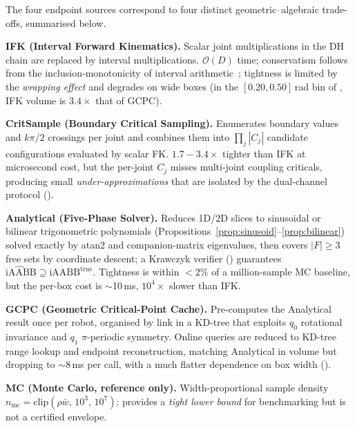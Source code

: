 \documentclass[journal]{IEEEtran}
\newcommand{\iAABB}{\mathrm{iAABB}}
\begin{document}
The four endpoint sources correspond to four distinct geometric--algebraic
trade-offs, summarised below.

\textbf{IFK (Interval Forward Kinematics).}
Scalar joint multiplications in the DH chain are replaced by interval
multiplications. $\mathcal{O}(D)$ time; conservatism follows from the
inclusion-monotonicity of interval arithmetic~\cite{moore2009introduction,
jaulin2001applied}; tightness is limited by the \emph{wrapping effect}
and degrades on wide boxes (in the $[0.20,0.50]$\,rad bin of
, IFK volume is $3.4\times$ that of GCPC).

\textbf{CritSample (Boundary Critical Sampling).}
Enumerates boundary values and $k\pi/2$ crossings per joint and combines
them into $\prod_j |C_j|$ candidate configurations evaluated by scalar
FK. $1.7\!-\!3.4\times$ tighter than IFK at microsecond cost, but the
per-joint $C_j$ misses multi-joint coupling criticals, producing small
\emph{under-approximations} that are isolated by the dual-channel
protocol ().

\textbf{Analytical (Five-Phase Solver).}
Reduces 1D/2D slices to sinusoidal or bilinear trigonometric polynomials
(Propositions~\ref{prop:sinusoid}--\ref{prop:bilinear}) solved
exactly by atan2 and companion-matrix eigenvalues, then covers
$|F|\geq 3$ free sets by coordinate descent; a Krawczyk verifier
() guarantees
$\widehat{\iAABB}\supseteq\iAABB^{\text{true}}$. Tightness is within
$<2\%$ of a million-sample MC baseline, but the per-box cost is
$\sim$10\,ms, $10^4\times$ slower than IFK.

\textbf{GCPC (Geometric Critical-Point Cache).}
Pre-computes the Analytical result once per robot, organised by link in
a KD-tree that exploits $q_0$ rotational invariance and $q_1$ $\pi$-periodic
symmetry. Online queries are reduced to KD-tree range lookup and endpoint
reconstruction, matching Analytical in volume but dropping to
$\sim$8\,ms per call, with a much flatter dependence on box width
().

\textbf{MC (Monte Carlo, reference only).}
Width-proportional sample density
$n_\text{mc} = \mathrm{clip}(\rho\bar{w},\,10^3,\,10^7)$; provides a
\emph{tight lower bound} for benchmarking but is not a certified
envelope.
\end{document}
